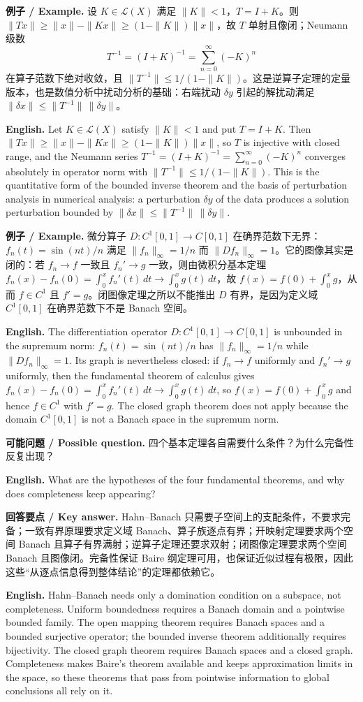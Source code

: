 \documentclass[UTF8,11pt,a4paper]{ctexart}
\newcommand{\EN}[1]{\par\noindent \textbf{English.} #1\par}
\newcommand{\EX}[2]{\par\noindent \textbf{例子 / Example.} #1\par\EN{#2}}
\newcommand{\ASK}[4]{\par\noindent \textbf{可能问题 / Possible question.} #1\par\EN{#2}\noindent \textbf{回答要点 / Key answer.} #3\par\EN{#4}\smallskip}
\begin{document}
\EX{设 $K\in\mathcal L(X)$ 满足 $\|K\|<1$，$T=I+K$。则 $\|Tx\|\ge\|x\|-\|Kx\|\ge(1-\|K\|)\|x\|$，故 $T$ 单射且像闭；Neumann 级数
\[
T^{-1}=(I+K)^{-1}=\sum_{n=0}^{\infty}(-K)^n
\]
在算子范数下绝对收敛，且 $\|T^{-1}\|\le1/(1-\|K\|)$。这是逆算子定理的定量版本，也是数值分析中扰动分析的基础：右端扰动 $\delta y$ 引起的解扰动满足 $\|\delta x\|\le\|T^{-1}\|\,\|\delta y\|$。}{Let $K\in\mathcal L(X)$ satisfy $\|K\|<1$ and put $T=I+K$. Then $\|Tx\|\ge\|x\|-\|Kx\|\ge(1-\|K\|)\|x\|$, so $T$ is injective with closed range, and the Neumann series $T^{-1}=(I+K)^{-1}=\sum_{n=0}^{\infty}(-K)^n$ converges absolutely in operator norm with $\|T^{-1}\|\le1/(1-\|K\|)$. This is the quantitative form of the bounded inverse theorem and the basis of perturbation analysis in numerical analysis: a perturbation $\delta y$ of the data produces a solution perturbation bounded by $\|\delta x\|\le\|T^{-1}\|\,\|\delta y\|$.}

\EX{微分算子 $D:C^1[0,1]\to C[0,1]$ 在确界范数下无界：$f_n(t)=\sin(nt)/n$ 满足 $\|f_n\|_\infty=1/n$ 而 $\|Df_n\|_\infty=1$。它的图像其实是闭的：若 $f_n\to f$ 一致且 $f_n'\to g$ 一致，则由微积分基本定理 $f_n(x)-f_n(0)=\int_0^xf_n'(t)\,dt\to\int_0^xg(t)\,dt$，故 $f(x)=f(0)+\int_0^xg$，从而 $f\in C^1$ 且 $f'=g$。闭图像定理之所以不能推出 $D$ 有界，是因为定义域 $C^1[0,1]$ 在确界范数下不是 Banach 空间。}{The differentiation operator $D:C^1[0,1]\to C[0,1]$ is unbounded in the supremum norm: $f_n(t)=\sin(nt)/n$ has $\|f_n\|_\infty=1/n$ while $\|Df_n\|_\infty=1$. Its graph is nevertheless closed: if $f_n\to f$ uniformly and $f_n'\to g$ uniformly, then the fundamental theorem of calculus gives $f_n(x)-f_n(0)=\int_0^xf_n'(t)\,dt\to\int_0^xg(t)\,dt$, so $f(x)=f(0)+\int_0^xg$ and hence $f\in C^1$ with $f'=g$. The closed graph theorem does not apply because the domain $C^1[0,1]$ is not a Banach space in the supremum norm.}

\ASK{四个基本定理各自需要什么条件？为什么完备性反复出现？}{What are the hypotheses of the four fundamental theorems, and why does completeness keep appearing?}{Hahn--Banach 只需要子空间上的支配条件，不要求完备；一致有界原理要求定义域 Banach、算子族逐点有界；开映射定理要求两个空间 Banach 且算子有界满射；逆算子定理还要求双射；闭图像定理要求两个空间 Banach 且图像闭。完备性保证 Baire 纲定理可用，也保证近似过程有极限，因此这些“从逐点信息得到整体结论”的定理都依赖它。}{Hahn--Banach needs only a domination condition on a subspace, not completeness. Uniform boundedness requires a Banach domain and a pointwise bounded family. The open mapping theorem requires Banach spaces and a bounded surjective operator; the bounded inverse theorem additionally requires bijectivity. The closed graph theorem requires Banach spaces and a closed graph. Completeness makes Baire's theorem available and keeps approximation limits in the space, so these theorems that pass from pointwise information to global conclusions all rely on it.}
\end{document}
